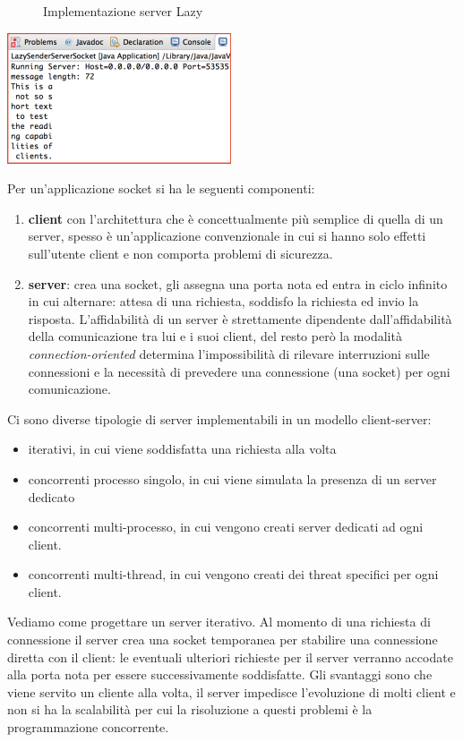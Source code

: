 \message{ !name(sd.tex)}\documentclass[a4paper,12pt, oneside]{book}
\begin{document}
\begin{figure}
    \caption{Implementazione server Lazy}
    \label{java:lazyServer}
    \inputminted{java}{code/JavaSocket/ServerWriter/LazySenderServerSocket.java}
\end{figure}

\begin{center}
	\includegraphics[scale=0.7]{img/lazy.png}
\end{center}
Per un'applicazione socket si ha le seguenti componenti:
\begin{enumerate}
	\item \textbf{client} con l'architettura che è concettualmente più semplice di quella di un server,
        spesso è un'applicazione convenzionale in cui si hanno solo effetti sull'utente client 
        e non comporta problemi di sicurezza.
	\item \textbf{server}: crea una socket, gli assegna una porta nota ed entra in ciclo infinito 
        in cui alternare: attesa di una richiesta, soddisfo la richiesta ed invio la risposta.\newline
	    L'affidabilità di un server è strettamente dipendente dall'affidabilità della comunicazione 
        tra lui e i suoi client, del resto però la modalità \textit{connection-oriented} determina 
        l'impossibilità di rilevare interruzioni sulle connessioni e la necessità di prevedere 
        una connessione (una socket) per ogni comunicazione.
\end{enumerate}
Ci sono diverse tipologie di server implementabili in un modello client-server:
\begin{itemize}
	\item iterativi, in cui viene soddisfatta una richiesta alla volta
	\item concorrenti processo singolo, in cui viene simulata la presenza di un server dedicato
	\item concorrenti multi-processo, in cui vengono creati server dedicati ad ogni client.
	\item concorrenti multi-thread, in cui vengono creati dei threat specifici per ogni client.
\end{itemize}
Vediamo come progettare un server iterativo. Al momento di una richiesta di connessione il server crea una
socket temporanea per stabilire una connessione diretta con il client: le eventuali ulteriori richieste
per il server verranno accodate alla porta nota per essere successivamente soddisfatte.\newline
Gli svantaggi sono che viene servito un cliente alla volta, il server impedisce l'evoluzione di molti
client e non si ha la scalabilità per cui la risoluzione a questi problemi è la programmazione concorrente.
\end{document}

